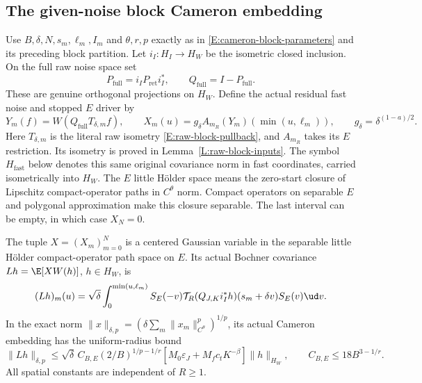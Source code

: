 \subsection{The given-noise block Cameron embedding}

Use $B,\delta,N,s_m,\ell_m,I_m$ and $\theta,r,p$ exactly as in
\eqref{E:cameron-block-parameters} and its preceding block partition.
Let $i_I:H_I\to H_W$ be the isometric closed inclusion.
On the full raw noise space set
\[
  P_{\mathrm{full}}=i_IP_{\mathrm{ret}}i_I^*,\qquad
  Q_{\mathrm{full}}=I-P_{\mathrm{full}} .
\]
These are genuine orthogonal projections on $H_W$.
Define the actual residual fast noise and stopped $E$ driver by
\begin{equation}\label{E:uniform-actual-residual}
  Y_m(f)=W(Q_{\mathrm{full}}T_{\delta,m}f),\qquad
  X_m(u)=g_\delta A_{m_R}(Y_m)(\min(u,\ell_m)),\qquad
  g_\delta=\delta^{(1-a)/2}.
\end{equation}
Here $T_{\delta,m}$ is the literal raw isometry
\eqref{E:raw-block-pullback}, and $A_{m_R}$ takes its $E$ restriction.
Its isometry is proved in Lemma~\ref{L:raw-block-inputs}.
The symbol $H_{\mathrm{fast}}$ below denotes this same original
covariance norm in fast coordinates, carried isometrically into $H_W$.
The $E$ little H\"older space means the zero-start closure of Lipschitz
compact-operator paths in $C^\theta$ norm. Compact operators on separable
$E$ and polygonal approximation make this closure separable.
The last interval can be empty, in which case $X_N=0$.

\begin{proposition}
  \label{P:uniform-actual-cameron}
  The tuple $X=(X_m)_{m=0}^N$ is a centered Gaussian variable in
  the separable little H\"older compact-operator path space on $E$.
  Its actual Bochner covariance $Lh=\E[XW(h)]$, $h\in H_W$, is
  \begin{equation}\label{E:uniform-actual-covariance}
    (Lh)_m(u)=\sqrt\delta\int_0^{\min(u,\ell_m)}
    S_E(-v)\mathcal T_R(Q_{J,K}i_I^*h)(s_m+\delta v)
    S_E(v)\ud v .
  \end{equation}
  In the exact norm
  $\|x\|_{\delta,p}=(\delta\sum_m\|x_m\|_{C^\theta}^p)^{1/p}$,
  its actual Cameron embedding has the uniform-radius bound
  \begin{equation}\label{E:uniform-actual-cameron-bound}
    \|Lh\|_{\delta,p}
    \le\sqrt\delta\,C_{B,E}(2/B)^{1/p-1/r}
    [M_0\varepsilon_J+M_fc_tK^{-\beta}]\|h\|_{H_W},
    \qquad C_{B,E}\le18B^{3-1/r}.
  \end{equation}
  All spatial constants are independent of $R\ge1$.
\end{proposition}


